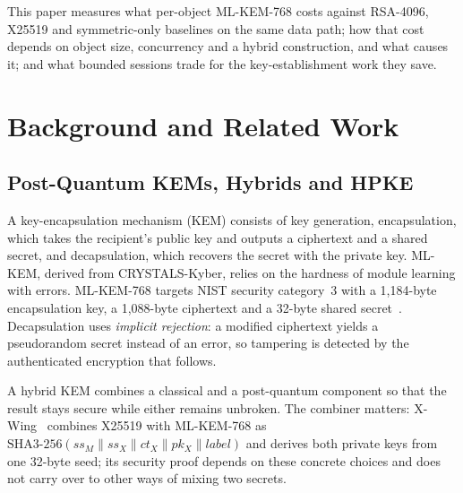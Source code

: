\documentclass[conference]{IEEEtran}
\begin{document}
This paper measures what per-object ML-KEM-768 costs against RSA-4096, X25519 and
symmetric-only baselines on the same data path; how that cost depends on object size,
concurrency and a hybrid construction, and what causes it; and what bounded sessions trade
for the key-establishment work they save.

\section{Background and Related Work}\label{sec:background}\label{sec:related}
\subsection{Post-Quantum KEMs, Hybrids and HPKE}\label{sec:kems}
A key-encapsulation mechanism (KEM) consists of key generation, encapsulation, which takes the
recipient's public key and outputs a ciphertext and a shared secret, and decapsulation, which
recovers the secret with the private key. ML-KEM, derived from CRYSTALS-Kyber, relies on the
hardness of module learning with errors. ML-KEM-768 targets NIST security category~3 with a
1{,}184-byte encapsulation key, a 1{,}088-byte ciphertext and a 32-byte shared
secret~\cite{fips203}. Decapsulation uses \emph{implicit rejection}: a modified ciphertext yields
a pseudorandom secret instead of an error, so tampering is detected by the authenticated
encryption that follows.

A hybrid KEM combines a classical and a post-quantum component so that the result stays secure
while either remains unbroken. The combiner matters: X-Wing~\cite{barbosa2024,xwing} combines
X25519 with ML-KEM-768 as
$\mathrm{SHA3\mbox{-}256}(ss_M\|ss_X\|ct_X\|pk_X\|\mathit{label})$ and derives both private keys
from one 32-byte seed; its security proof depends on these concrete choices and does not carry
over to other ways of mixing two secrets.
\end{document}
